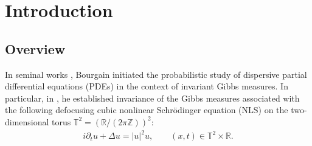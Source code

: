 \documentclass[%
11pt,  reqno]{amsart}
\newcommand{\1}{\hspace{0.2mm}\text{I}\hspace{0.2mm}}
\newcommand{\Z}{\mathbb{Z}}
\newcommand{\R}{\mathbb{R}}
\newcommand{\T}{\mathbb{T}}
\newcommand{\dt}{\partial_t}
\numberwithin{equation}{section}
\numberwithin{theorem}{section}
\begin{document}






\begin{abstract}
In a seminal paper (1996), Bourgain proved invariance of the Gibbs measure
for the defocusing cubic nonlinear Schr\"odinger equation on the two-dimensional torus
by 
constructing
local-in-time solutions in a probabilistic manner.
In this note, we revisit and streamline his argument, using the random
tensor estimate developed
by Deng, Nahmod, and Yue (2022).

\end{abstract}



%
\maketitle


\tableofcontents



\newpage


\section{Introduction}
\label{SEC:1}



\subsection{Overview}




In seminal works \cite{BO94, BO96}, Bourgain
initiated the probabilistic study of 
dispersive partial differential equations (PDEs)
in the context of invariant Gibbs measures.
In particular, in \cite{BO96}, 
he established invariance of the Gibbs measures
associated with  the following defocusing cubic 
nonlinear Schr\"odinger equation (NLS) on the two-dimensional torus
 $\T^2 = (\R / (2\pi \Z))^2$:
\begin{align}
i \dt u +  \Delta u =   |u|^{2}u, 
\qquad (x, t) \in \T^2 \times \R.
\label{NLS1}
\end{align}
\end{document}
